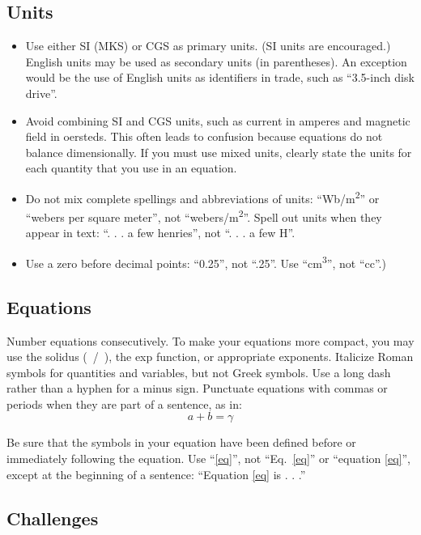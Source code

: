 \documentclass[conference]{IEEEtran}
\begin{document}
\subsection{Units}
\begin{itemize}
\item Use either SI (MKS) or CGS as primary units. (SI units are encouraged.) English units may be used as secondary units (in parentheses). An exception would be the use of English units as identifiers in trade, such as ``3.5-inch disk drive''.
\item Avoid combining SI and CGS units, such as current in amperes and magnetic field in oersteds. This often leads to confusion because equations do not balance dimensionally. If you must use mixed units, clearly state the units for each quantity that you use in an equation.
\item Do not mix complete spellings and abbreviations of units: ``Wb/m\textsuperscript{2}'' or ``webers per square meter'', not ``webers/m\textsuperscript{2}''. Spell out units when they appear in text: ``. . . a few henries'', not ``. . . a few H''.
\item Use a zero before decimal points: ``0.25'', not ``.25''. Use ``cm\textsuperscript{3}'', not ``cc''.)
\end{itemize}

\subsection{Equations}
Number equations consecutively. To make your 
equations more compact, you may use the solidus (~/~), the exp function, or 
appropriate exponents. Italicize Roman symbols for quantities and variables, 
but not Greek symbols. Use a long dash rather than a hyphen for a minus 
sign. Punctuate equations with commas or periods when they are part of a 
sentence, as in:
\begin{equation}
a+b=\gamma\label{eq}
\end{equation}



Be sure that the 
symbols in your equation have been defined before or immediately following 
the equation. Use ``\eqref{eq}'', not ``Eq.~\eqref{eq}'' or ``equation \eqref{eq}'', except at 
the beginning of a sentence: ``Equation \eqref{eq} is . . .''

\subsection{Challenges}
\end{document}
